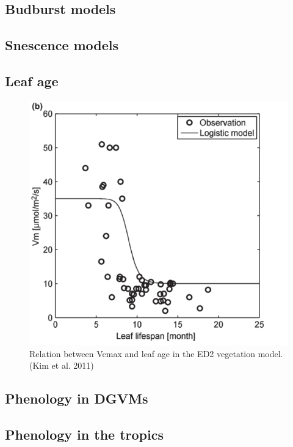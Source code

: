 \documentclass[12pt,oneside]{book}
\begin{document}
\subsection{Budburst models}\label{budburst-models}

\subsection{Snescence models}\label{snescence-models}

\subsection{Leaf age}\label{leaf-age}

\begin{figure}

{\centering \includegraphics[width=0.8\linewidth]{figures/chap4/f46_vc_age} 

}

\caption{Relation  between Vcmax and leaf age in the ED2 vegetation model. (Kim et al. 2011)}\label{fig:f46}
\end{figure}

\subsection{Phenology in DGVMs}\label{phenology-in-dgvms}

\subsection{Phenology in the tropics}\label{phenology-in-the-tropics}
\end{document}
